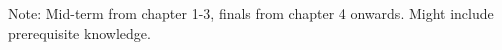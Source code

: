 \documentclass{article}
\begin{document}



\newpage
\hypertarget{toc}{}
\tableofcontents

Note: Mid-term from chapter 1-3, finals from chapter 4 onwards. Might include prerequisite knowledge.
\newpage










\end{document}
